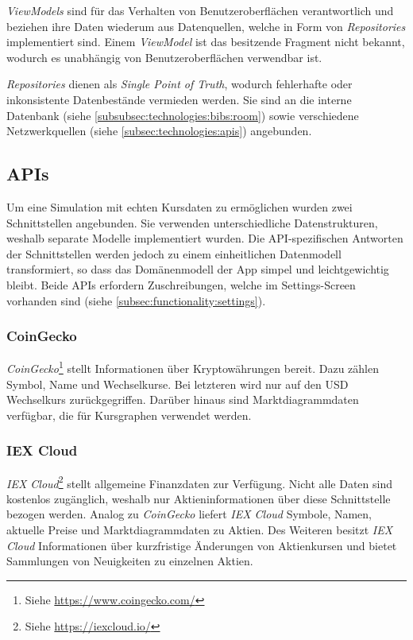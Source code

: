 \documentclass[a4paper]{article}
\begin{document}
\textit{ViewModels} sind für das Verhalten von Benutzeroberflächen verantwortlich und beziehen ihre Daten wiederum aus Datenquellen, welche in Form von \textit{Repositories} implementiert sind.
Einem \textit{ViewModel} ist das besitzende Fragment nicht bekannt, wodurch es unabhängig von Benutzeroberflächen verwendbar ist.

\textit{Repositories} dienen als \textit{Single Point of Truth}, wodurch fehlerhafte oder inkonsistente Datenbestände vermieden werden.
Sie sind an die interne Datenbank (siehe \autoref{subsubsec:technologies:bibs:room}) sowie verschiedene Netzwerkquellen (siehe \autoref{subsec:technologies:apis}) angebunden.


\subsection{APIs}
\label{subsec:technologies:apis}
Um eine Simulation mit echten Kursdaten zu ermöglichen wurden zwei Schnittstellen angebunden.
Sie verwenden unterschiedliche Datenstrukturen, weshalb separate Modelle implementiert wurden.
Die API-spezifischen Antworten der Schnittstellen werden jedoch zu einem einheitlichen Datenmodell transformiert, so dass das Domänenmodell der App simpel und leichtgewichtig bleibt.
Beide APIs erfordern Zuschreibungen, welche im Settings-Screen vorhanden sind (siehe \autoref{subsec:functionality:settings}).


\subsubsection{CoinGecko}
\label{subsubsec:technologies:apis:coingecko}
\textit{CoinGecko}\footnote{Siehe \url{https://www.coingecko.com/}} stellt Informationen über Kryptowährungen bereit.
Dazu zählen Symbol, Name und Wechselkurse.
Bei letzteren wird nur auf den USD Wechselkurs zurückgegriffen.
Darüber hinaus sind Marktdiagrammdaten verfügbar, die für Kursgraphen verwendet werden.


\subsubsection{IEX Cloud}
\label{subsubsec:technologies:apis:iex}
\textit{IEX Cloud}\footnote{Siehe \url{https://iexcloud.io/}} stellt allgemeine Finanzdaten zur Verfügung.
Nicht alle Daten sind kostenlos zugänglich, weshalb nur Aktieninformationen über diese Schnittstelle bezogen werden.
Analog zu \textit{CoinGecko} liefert \textit{IEX Cloud} Symbole, Namen, aktuelle Preise und Marktdiagrammdaten zu Aktien.
Des Weiteren besitzt \textit{IEX Cloud} Informationen über kurzfristige Änderungen von Aktienkursen und bietet Sammlungen von Neuigkeiten zu einzelnen Aktien.
\end{document}
